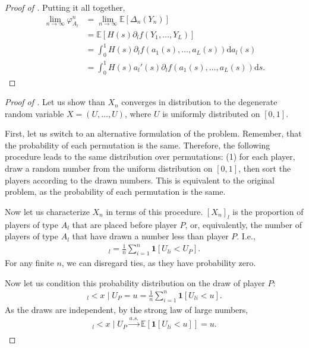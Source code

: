 \documentclass[a4paper]{article}
\newcommand{\ds}{\mathrm{d}s}
\newcommand{\E}{\mathbb{E}}
\begin{document}
\begin{proof}[Proof of ]
    Putting it all together,
    \begin{align*}
        \lim_{n \to \infty} \varphi_{A_{l}}^n &= \lim_{n \to \infty} \E[\Delta_n (Y_n)] \\
        &= \E[ H(s) \partial_l f(Y_1, \dots, Y_L) ] \\
        &= \int_0^1 H(s) \partial_l f(a_1(s), \dots, a_L(s)) \mathrm{d} a_l(s) \\
        &= \int_0^1 H(s) a_l'(s) \partial_l f(a_1(s), \dots, a_L(s)) \ds.
    \end{align*}

\end{proof}

\begin{proof}[Proof of ]
    Let us show than $X_n$ converges in distribution to the degenerate random variable $X = (U, \dots, U)$, where $U$ is uniformly distributed on $[0, 1]$.

    First, let us switch to an alternative formulation of the problem.
    Remember, that the probability of each permutation is the same.
    Therefore, the following procedure leads to the same distribution over permutations: (1) for each player, draw a random number from the uniform distribution on $[0, 1]$, then sort the players according to the drawn numbers.
    This is equivalent to the original problem, as the probability of each permutation is the same.

    Now let us characterize $X_n$ in terms of this procedure.
    $[X_n]_l$ is the proportion of players of type $A_l$ that are placed before player $P$, or, equivalently, the number of players of type $A_l$ that have drawn a number less than player $P$.
    I.e.,
    \begin{align*}
        [X_n]_l = \frac{1}{n}\sum_{i = 1}^n \mathbf{1}[U_{li} < U_P].
    \end{align*}
    For any finite $n$, we can disregard ties, as they have probability zero.

    Now let us condition this probability distribution on the draw of player $P$:
    \begin{align*}
        [X_n]_l < x \mid U_P = u = \frac{1}{n} \sum_{i=1}^n \mathbf{1}[U_{li} < u].
    \end{align*}
    As the draws are independent, by the strong law of large numbers,
    \begin{align*}
        [X_n]_l < x \mid U_P \xrightarrow[]{a.s.} \E[\mathbf{1}[U_{li} < u]] = u.
    \end{align*}
    

\end{proof}
\end{document}
